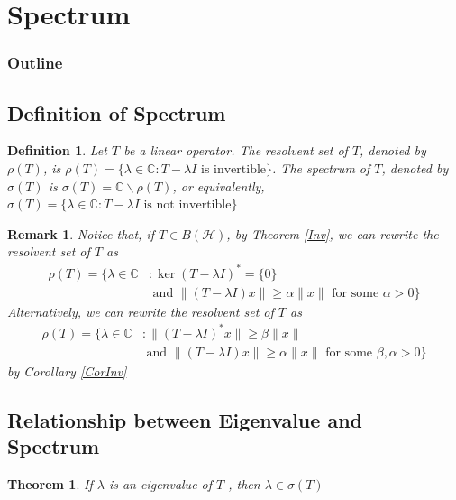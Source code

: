 \documentclass{beamer}
\newtheorem{thm}{Theorem}
\newtheorem{defn}{Definition}
\newtheorem{rem}{Remark}
\begin{document}
  \section{Spectrum}
  \begin{frame}
    \frametitle{Outline}
    \tableofcontents[current]
  \end{frame}

  \subsection{Definition of Spectrum}
  \begin{frame}{\subsecname}
    \begin{defn}
      Let $T$ be a linear operator. The resolvent set of $T$, denoted by $\rho(T)$, is $\rho(T) = \{\lambda\in\mathbb{C}: T-\lambda I\text{ is invertible}\}$. The spectrum of $T$, denoted by $\sigma(T)$ is $\sigma(T)=\mathbb{C}\backslash\rho(T)$, or equivalently, $\sigma(T) = \{\lambda\in\mathbb{C}: T-\lambda I\text{ is not invertible}\}$
    \end{defn}
  \end{frame}

  \begin{frame}{\subsecname}
    \begin{rem} \label{defRho}
      Notice that, if $T\in B(\mathcal{H})$, by Theorem \ref{Inv}, we can rewrite the resolvent set of $T$ as
      $$
      \begin{aligned}
        \rho(T) = \{\lambda\in\mathbb{C}&: \operatorname{ker}(T-\lambda I)^{*}=\{0\}\\
                                        &\text{ and }\lVert (T-\lambda I)x\rVert\geq\alpha\lVert x\rVert\text{ for some }\alpha>0\}
      \end{aligned}
      $$
      Alternatively, we can rewrite the resolvent set of $T$ as
      $$
      \begin{aligned}
        \rho(T) = \{\lambda\in\mathbb{C}&: \lVert (T-\lambda I)^{*}x\rVert\geq\beta\lVert x\rVert\\
                                        &\text{ and }\lVert (T-\lambda I)x\rVert\geq\alpha\lVert x\rVert\text{ for some }\beta,\alpha>0\}
      \end{aligned}
      $$
      by Corollary \ref{CorInv}
    \end{rem}
  \end{frame}

  \subsection{Relationship between Eigenvalue and Spectrum}
  \begin{frame}{\subsecname}
    \begin{thm}
    If $\lambda$ is an eigenvalue of $T$ , then $\lambda \in \sigma(T)$
    \end{thm}
  \end{frame}
\end{document}
